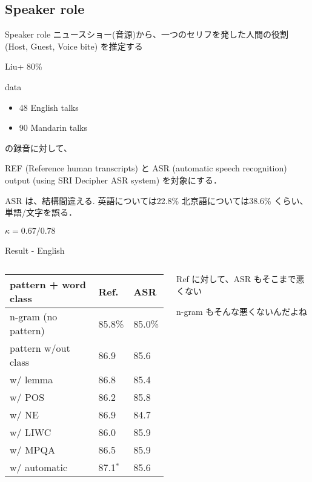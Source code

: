 \documentclass[12pt, dvipdfmx, default, cjk]{beamer}
\begin{document}
\subsection{Speaker role}
\begin{frame}{Speaker role}
  ニュースショー(音源)から、一つのセリフを発した人間の役割 (Host, Guest, Voice bite) を推定する

  Liu+ 80\%
\end{frame}

\begin{frame}{data}
  \begin{itemize}
    \item 48 English talks
    \item 90 Mandarin talks
  \end{itemize}
  の録音に対して、

  \alert{REF} (Reference human transcripts) と
  \alert{ASR} (automatic speech recognition) output
(using SRI Decipher ASR system)
を対象にする．

ASR は、結構間違える.
英語については22.8\%
北京語については38.6\%
くらい、単語/文字を誤る．

$\kappa = 0.67 / 0.78$
\end{frame}

\begin{frame}{Result - English}
\begin{columns}
 \begin{column}{0.63\textwidth}
   \begin{table}[h]
     \begin{tabular}{l|l|l} \hline
       pattern + word class  & Ref.     & ASR \\ \hline
       n-gram (no pattern)   & 85.8\%   & 85.0\% \\
       pattern w/out class & 86.9     & 85.6 \\
       w/ lemma     & 86.8               & 85.4 \\
       w/ POS       & 86.2               & 85.8 \\
       w/ NE        & 86.9               & 84.7 \\
       w/ LIWC      & 86.0               & \alert{85.9} \\
       w/ MPQA      & 86.5               & \alert{85.9} \\
       w/ automatic & \alert{87.1}${^*}$ & 85.6 \\ \hline
     \end{tabular}
   \end{table}
 \end{column}
 \begin{column}{0.3\textwidth}
   Ref に対して、ASR もそこまで悪くない

   n-gram もそんな悪くないんだよね
 \end{column}
 \end{columns}
\end{frame}
\end{document}
